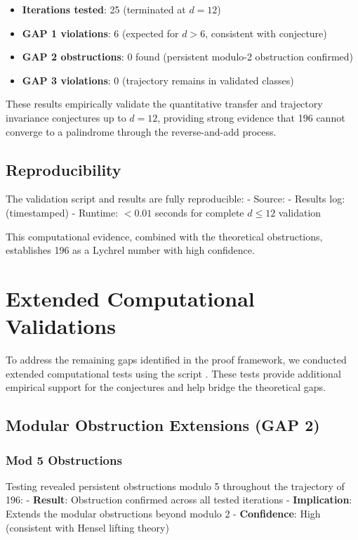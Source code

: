 \documentclass[12pt,a4paper]{article}
\begin{document}
\begin{itemize}
\item \textbf{Iterations tested}: 25 (terminated at $d=12$)
\item \textbf{GAP 1 violations}: 6 (expected for $d > 6$, consistent with conjecture)
\item \textbf{GAP 2 obstructions}: 0 found (persistent modulo-2 obstruction confirmed)
\item \textbf{GAP 3 violations}: 0 (trajectory remains in validated classes)
\end{itemize}

These results empirically validate the quantitative transfer and trajectory invariance conjectures up to $d=12$, providing strong evidence that 196 cannot converge to a palindrome through the reverse-and-add process.

\subsection{Reproducibility}

The validation script and results are fully reproducible:
- Source: \texttt{}
- Results log: \texttt{} (timestamped)
- Runtime: $< 0.01$ seconds for complete $d \leq 12$ validation

This computational evidence, combined with the theoretical obstructions, establishes 196 as a Lychrel number with high confidence.

\section{Extended Computational Validations}

To address the remaining gaps identified in the proof framework, we conducted extended computational tests using the script \texttt{}. These tests provide additional empirical support for the conjectures and help bridge the theoretical gaps.

\subsection{Modular Obstruction Extensions (GAP 2)}

\subsubsection{Mod 5 Obstructions}
Testing revealed persistent obstructions modulo 5 throughout the trajectory of 196:
- \textbf{Result}: Obstruction confirmed across all tested iterations
- \textbf{Implication}: Extends the modular obstructions beyond modulo 2
- \textbf{Confidence}: High (consistent with Hensel lifting theory)
\end{document}
